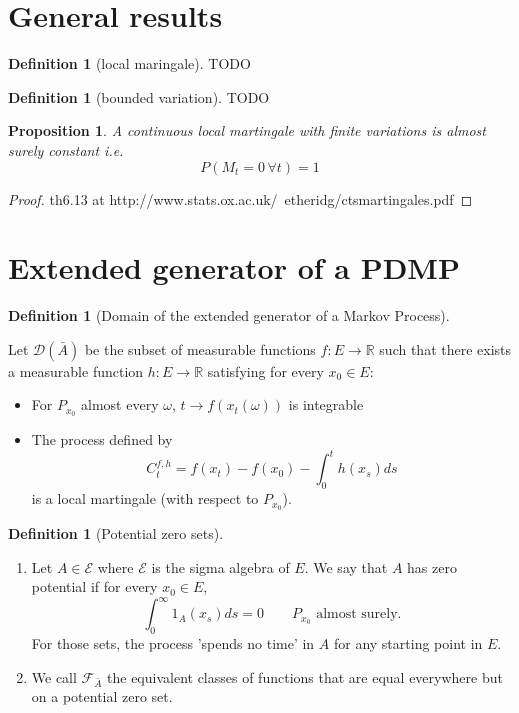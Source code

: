 \documentclass[11pt]{amsart}
\newtheorem{proposition}[theorem]{Proposition}
\theoremstyle{definition}
\newtheorem{definition}[theorem]{Definition}
\theoremstyle{remark}
\newcommand{\depends}[1]{}
\newcommand{\extgen}{\bar{A}}
\newcommand{\Feqgen}{\mathcal{F}_{\extgen}}
\begin{document}
\section{General results}\label{sec:general-res}

\begin{definition}[local maringale]\label{def:loc-martingale}
TODO
\end{definition}

\begin{definition}[bounded variation]\label{def:bounded-variation}
TODO
\end{definition}

\begin{proposition}\label{prop:loc-martingale-finite-variation-cst}
A continuous local martingale with finite variations is almost surely constant i.e.
\[
	P(M_t = 0 \, \forall t) = 1
\]
\end{proposition}
\begin{proof}
th6.13 at 
http://www.stats.ox.ac.uk/~etheridg/ctsmartingales.pdf
\end{proof}

\section{Extended generator of a PDMP}\label{sec:Ext-gen-Markov}
\depends{}

\begin{definition}[Domain of the extended generator of a Markov Process]\label{def:ext-gen-domain}
\depends{def:loc-martingale}
Let $\mathcal{D}(\extgen)$ be the subset of measurable functions $f:E\rightarrow \mathbb{R}$ such that there 
exists a measurable function $h: E \rightarrow \mathbb{R}$ satisfying for every $x_0\in E$:
\begin{itemize}
	\item For $P_{x_0}$ almost every $\omega$, $t\rightarrow f(x_t(\omega))$ is integrable
	\item The process defined by
	\[
		C_t^{f,h} = f(x_t) - f(x_0) - \int_0^t h(x_s) ds
	\]
	is a local martingale (with respect to $P_{x_0}$).
\end{itemize}
\end{definition}

\begin{definition}[Potential zero sets]\label{def:potential-zero-set}
\begin{enumerate}
\item Let $A \in \mathcal{E}$ where $\mathcal{E}$ is the sigma algebra of $E$. We say that $A$ has zero potential if for every $x_0\in E$, 
\[
	\int_0^\infty 1_A(x_s) ds = 0 \qquad P_{x_0} \text{ almost surely}.
\]
For those sets, the process 'spends no time' in $A$ for any starting point in $E$. 
\item We call $\Feqgen$ the equivalent classes of functions that are equal everywhere but on a potential zero set.
\end{enumerate}
\end{definition}
\end{document}
